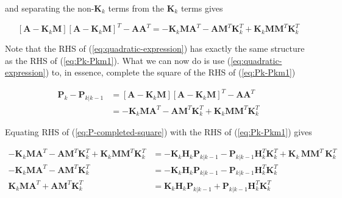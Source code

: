 and separating the non-$\mathbf{K}_k$ terms from the $\mathbf{K}_k$ terms gives

\begin{equation}
    \left[ \mathbf{A} - \mathbf{K}_k \mathbf{M} \right] \left[ \mathbf{A} - \mathbf{K}_k \mathbf{M} \right]^T - \mathbf{A} \mathbf{A}^T
    = - \mathbf{K}_k \mathbf{M} \mathbf{A}^T - \mathbf{A} \mathbf{M}^T \mathbf{K}_k^T + \mathbf{K}_k \mathbf{M} \mathbf{M}^T \mathbf{K}_k^T
    \label{eq:quadratic-expression}
\end{equation}

Note that the RHS of (\ref{eq:quadratic-expression}) has exactly the same structure as the
RHS of (\ref{eq:Pk-Pkm1}).
What we can now do is use (\ref{eq:quadratic-expression}) to, in essence, complete the
square of the RHS of (\ref{eq:Pk-Pkm1})

\begin{equation}
    \begin{aligned}
        \mathbf{P}_{k} - \mathbf{P}_{k|k-1}
        &= \left[ \mathbf{A} - \mathbf{K}_k \mathbf{M} \right] \left[ \mathbf{A} - \mathbf{K}_k \mathbf{M} \right]^T - \mathbf{A} \mathbf{A}^T \\
        &= - \mathbf{K}_k \mathbf{M} \mathbf{A}^T - \mathbf{A} \mathbf{M}^T \mathbf{K}_k^T + \mathbf{K}_k \mathbf{M} \mathbf{M}^T \mathbf{K}_k^T
    \end{aligned}
    \label{eq:P-completed-square}
\end{equation}

Equating RHS of (\ref{eq:P-completed-square}) with the RHS of (\ref{eq:Pk-Pkm1}) gives

\begin{equation*}
    \begin{aligned}
        - \mathbf{K}_k \mathbf{M} \mathbf{A}^T - \mathbf{A} \mathbf{M}^T \mathbf{K}_k^T + \mathbf{K}_k \mathbf{M} \mathbf{M}^T \mathbf{K}_k^T &=
        - \mathbf{K}_k \mathbf{H}_k \mathbf{P}_{k|k-1} - \mathbf{P}_{k|k-1} \mathbf{H}_k^T \mathbf{K}_k^T + \mathbf{K}_k \, \mathbf{M} \mathbf{M}^T \, \mathbf{K}_k^T \\
        - \mathbf{K}_k \mathbf{M} \mathbf{A}^T - \mathbf{A} \mathbf{M}^T \mathbf{K}_k^T &=
        - \mathbf{K}_k \mathbf{H}_k \mathbf{P}_{k|k-1} - \mathbf{P}_{k|k-1} \mathbf{H}_k^T \mathbf{K}_k^T \\
        \mathbf{K}_k \mathbf{M} \mathbf{A}^T + \mathbf{A} \mathbf{M}^T \mathbf{K}_k^T &=
        \mathbf{K}_k \mathbf{H}_k \mathbf{P}_{k|k-1} + \mathbf{P}_{k|k-1} \mathbf{H}_k^T \mathbf{K}_k^T
    \end{aligned}
\end{equation*}

